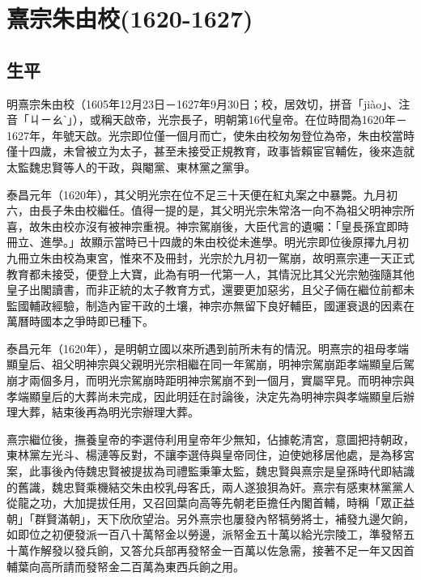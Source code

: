 
\section{熹宗朱由校\tiny(1620-1627)}

\subsection{生平}

明熹宗朱由校（1605年12月23日－1627年9月30日；校，居效切，拼音「jiào」、注音「ㄐㄧㄠˋ」），或稱天啟帝，光宗長子，明朝第16代皇帝。在位時間為1620年－1627年，年號天啟。光宗即位僅一個月而亡，使朱由校匆匆登位為帝，朱由校當時僅十四歲，未曾被立为太子，甚至未接受正規教育，政事皆賴宦官輔佐，後來造就太監魏忠賢等人的干政，與閹黨、東林黨之黨爭。

泰昌元年（1620年），其父明光宗在位不足三十天便在紅丸案之中暴斃。九月初六，由長子朱由校繼任。值得一提的是，其父明光宗朱常洛一向不為祖父明神宗所喜，故朱由校亦沒有被神宗重視。神宗駕崩後，大臣代言的遺囑：「皇長孫宜即時冊立、進學。」故顯示當時已十四歲的朱由校從未進學。明光宗即位後原擇九月初九冊立朱由校為東宮，惟來不及冊封，光宗於九月初一駕崩，故明熹宗連一天正式教育都未接受，便登上大寶，此為有明一代第一人，其情況比其父光宗勉強隨其他皇子出閣讀書，而非正統的太子教育方式，還要更加惡劣，且父子倆在繼位前都未監國輔政經驗，制造內宦干政的土壤，神宗亦無留下良好輔臣，國運衰退的因素在萬曆時國本之爭時即已種下。

泰昌元年（1620年），是明朝立國以來所遇到前所未有的情況。明熹宗的祖母孝端顯皇后、祖父明神宗與父親明光宗相繼在同一年駕崩，明神宗駕崩距孝端顯皇后駕崩才兩個多月，而明光宗駕崩時距明神宗駕崩不到一個月，實屬罕見。而明神宗與孝端顯皇后的大葬尚未完成，因此明廷在討論後，決定先為明神宗與孝端顯皇后辦理大葬，結束後再為明光宗辦理大葬。

熹宗繼位後，撫養皇帝的李選侍利用皇帝年少無知，佔據乾清宮，意圖把持朝政，東林黨左光斗、楊漣等反對，不讓李選侍與皇帝同住，迫使她移居他處，是為移宮案，此事後內侍魏忠賢被提拔為司禮監秉筆太監，魏忠賢與熹宗是皇孫時代即結識的舊識，魏忠賢乘機結交朱由校乳母客氏，兩人遂狼狽為奸。熹宗有感東林黨黨人從龍之功，大加提拔任用，又召回葉向高等先朝老臣擔任內閣首輔，時稱「眾正益朝」「群賢滿朝」，天下欣欣望治。另外熹宗也屢發內帑犒勞將士，補發九邊欠餉，如即位之初便發派一百八十萬帑金以勞邊，派帑金五十萬以給光宗陵工，準發帑五十萬作解發以發兵餉，又答允兵部再發帑金一百萬以佐急需，接著不足一年又因首輔葉向高所請而發帑金二百萬為東西兵餉之用。

